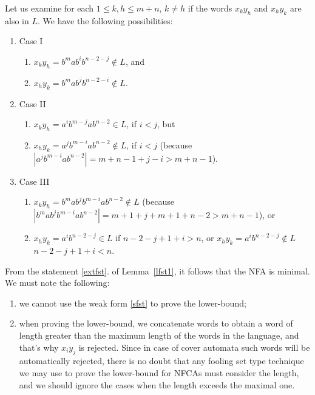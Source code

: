 \documentclass[submission,copyright,creativecommons]{eptcs}
\begin{document}
Let us examine for each $1\leq k,h\leq m+n$, $k\neq h$ if  the words  
$x_ky_h$ and 
$x_hy_k$ are also in $L$. We have the following possibilities:
\begin{enumerate}
  \item Case I
  \begin{enumerate}
   \item $x_ky_h=b^mab^ib^{n-2-j}\notin L$, and
   \item $x_hy_k=b^mab^jb^{n-2-i}\notin L$.
  \end{enumerate}
 \item Case II
  \begin{enumerate}
   \item $x_ky_h=a^ib^{m-j}ab^{n-2}\in L$, if $i<j$, but 
   \item $x_hy_k=a^jb^{m-i}ab^{n-2}\notin L$, if $i<j$ (because $|a^jb^{m-i}ab^{n-2}|=m+n-1+j-i>m+n-1$).
  \end{enumerate}
 \item Case III
  \begin{enumerate}
   \item $x_ky_h=b^{m}ab^jb^{m-i}ab^{n-2}\notin L$ (because $|b^{m}ab^jb^{m-i}ab^{n-2}|=m+1+j+m+1+n-2>m+n-1$), or
   \item $x_hy_k=a^ib^{n-2-j}\in L$ if $n-2-j+1+i>n$, 
         or 
         $x_hy_k=a^ib^{n-2-j}\notin L$ $n-2-j+1+i<n$.
  \end{enumerate}
\end{enumerate}
From the statement \ref{extfst}. of Lemma~\ref{lfst1}, it follows that the NFA is minimal. 
We must note the following:
\begin{enumerate}
 \item we cannot use the weak form \ref{sfst} to prove the lower-bound;
 \item when proving the lower-bound, we concatenate words to obtain a word 
of length greater than the maximum length of the words in the language, and 
that's why $x_iy_j$ is rejected.
Since in case of cover automata such words will be automatically rejected, there is no doubt that any fooling set type 
technique we may use to prove the lower-bound for NFCAs must consider the length, and 
we should ignore the cases when the length exceeds the maximal one.
\end{enumerate}
\end{document}
